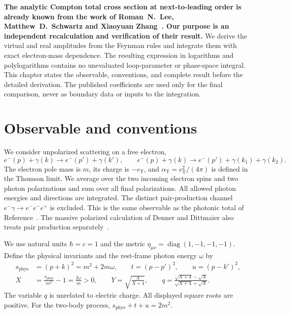 \textbf{The analytic Compton total cross section at next-to-leading
order is already known from the work of Roman~N.~Lee, Matthew~D.~Schwartz and
Xiaoyuan Zhang~\cite{qed-processes-lsz}. Our purpose is an independent
recalculation and verification of their result.}
We derive the virtual and real amplitudes from the Feynman rules and
integrate them with exact electron-mass dependence. The resulting
expression in logarithms and polylogarithms contains no unevaluated
loop-parameter or phase-space integral. This chapter states the
observable, conventions, and complete result before the detailed
derivation. The published coefficients are used only for the final
comparison, never as boundary data or inputs to the integration.

\section{Observable and conventions}
We consider unpolarized scattering on a free electron,
\begin{equation}
 e^-(p)+\gamma(k)\longrightarrow e^-(p')+\gamma(k'),
 \qquad
 e^-(p)+\gamma(k)\longrightarrow e^-(p')+\gamma(k_1)+\gamma(k_2).
\end{equation}
The electron pole mass is $m$, its charge is $-e_{\mathrm T}$, and
$\alpha_{\mathrm T}=e_{\mathrm T}^2/(4\pi)$ is defined in the Thomson
limit. We average over the two incoming electron spins and two photon
polarizations and sum over all final polarizations. All allowed photon
energies and directions are integrated. The distinct pair-production
channel $e^-\gamma\to e^-e^-e^+$ is excluded. This is the same
observable as the photonic total of Reference~\cite{qed-processes-lsz}.
The massive polarized calculation of Denner and Dittmaier also treats
pair production separately~\cite{qed-processes-denner}.

We use natural units $\hbar=c=1$ and the metric
$\eta_{\mu\nu}=\operatorname{diag}(1,-1,-1,-1)$.
Define the physical invariants and the
rest-frame photon energy $\omega$ by
\begin{align}
 s_{\mathrm{phys}}&=(p+k)^2=m^2+2m\omega,\qquad
 t=(p-p')^2,\qquad u=(p-k')^2,\\
 X&=\frac{s_{\mathrm{phys}}}{m^2}-1=\frac{2\omega}{m}>0,\qquad
 Y=\sqrt{\frac{X}{X+4}},\qquad
 q=\frac{\sqrt{X+4}-\sqrt X}{\sqrt{X+4}+\sqrt X}.
 \label{eq:comp-overview-variables}
\end{align}
The variable $q$ is unrelated to electric charge. All displayed square
roots are positive. For the two-body process,
$s_{\mathrm{phys}}+t+u=2m^2$.

